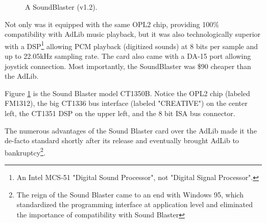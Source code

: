 \documentclass[book.tex]{subfiles}
\begin{document}
\begin{figure}[H] 
  \centering 
  \caption{A SoundBlaster (v1.2). }
  \label{asb12}
\end{figure}
\par
Not only was it equipped with the same OPL2 chip, providing 100\% compatibility with AdLib music playback, but it was also technologically superior with a DSP\footnote{An Intel MCS-51 "Digital Sound Processor", not "Digital Signal Processor".}  allowing PCM playback (digitized sounds) at 8 bits per sample and up to 22.05kHz sampling rate. The card also came with a DA-15 port allowing joystick connection. Most importantly, the SoundBlaster was \$90 cheaper than the AdLib.\\
\par
Figure \ref{asb12} is the Sound Blaster model CT1350B. Notice the OPL2 chip (labeled FM1312), the big CT1336 bus interface (labeled "CREATIVE") on the center left, the CT1351 DSP on the upper left, and the 8 bit ISA bus connector.\\
\par
   The numerous advantages of the Sound Blaster card over the AdLib made it the de-facto standard shortly after its release and eventually brought AdLib to bankruptcy\footnote{The reign of the Sound Blaster came to an end with Windows 95, which standardized the programming interface at application level and eliminated the importance of compatibility with Sound Blaster}.
\end{document}
